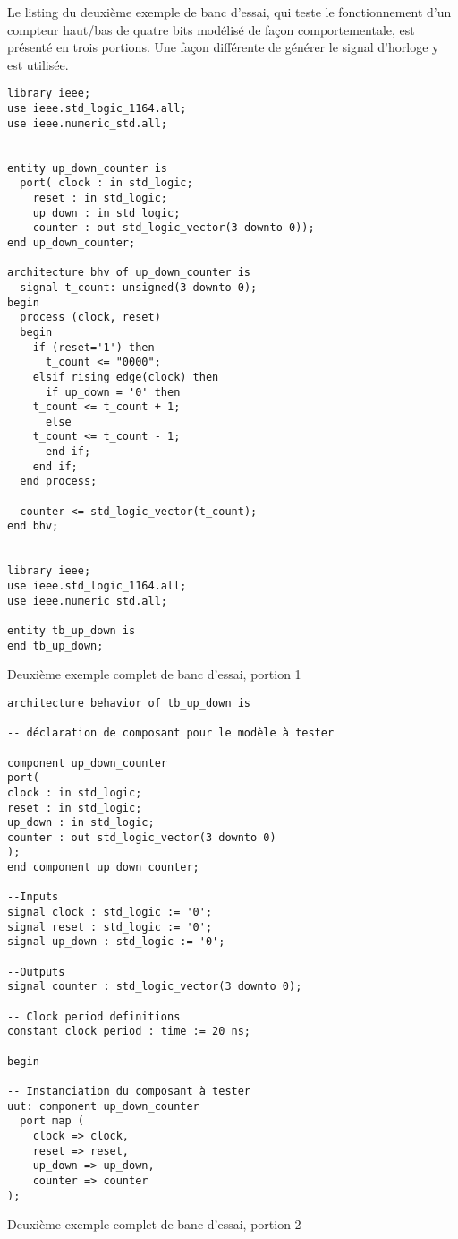 \documentclass[11pt]{article}
\begin{document}
Le listing du deuxième exemple de banc d'essai, qui teste le
fonctionnement d'un compteur haut/bas de quatre bits modélisé de façon
comportementale, est présenté en trois portions. Une façon différente
de générer le signal d'horloge y est utilisée.

\begin{listing}[htbp]
\begin{verbatim}
library ieee;
use ieee.std_logic_1164.all;
use ieee.numeric_std.all;


entity up_down_counter is
  port( clock : in std_logic;
	reset : in std_logic;
	up_down : in std_logic;
	counter : out std_logic_vector(3 downto 0));
end up_down_counter;

architecture bhv of up_down_counter is
  signal t_count: unsigned(3 downto 0);
begin
  process (clock, reset)
  begin
    if (reset='1') then
      t_count <= "0000";
    elsif rising_edge(clock) then
      if up_down = '0' then
	t_count <= t_count + 1;
      else
	t_count <= t_count - 1;
      end if;
    end if;
  end process;

  counter <= std_logic_vector(t_count);
end bhv;


library ieee;
use ieee.std_logic_1164.all;
use ieee.numeric_std.all;

entity tb_up_down is
end tb_up_down;

\end{verbatim}
\caption{Deuxième exemple complet de banc d'essai, portion 1}
\end{listing}

\begin{listing}[htbp]
\begin{verbatim}
architecture behavior of tb_up_down is

-- déclaration de composant pour le modèle à tester

component up_down_counter
port(
clock : in std_logic;
reset : in std_logic;
up_down : in std_logic;
counter : out std_logic_vector(3 downto 0)
);
end component up_down_counter;

--Inputs
signal clock : std_logic := '0';
signal reset : std_logic := '0';
signal up_down : std_logic := '0';

--Outputs
signal counter : std_logic_vector(3 downto 0);

-- Clock period definitions
constant clock_period : time := 20 ns;

begin

-- Instanciation du composant à tester
uut: component up_down_counter
  port map (
    clock => clock,
    reset => reset,
    up_down => up_down,
    counter => counter
);

\end{verbatim}
\caption{Deuxième exemple complet de banc d'essai, portion 2}
\end{listing}
\end{document}
